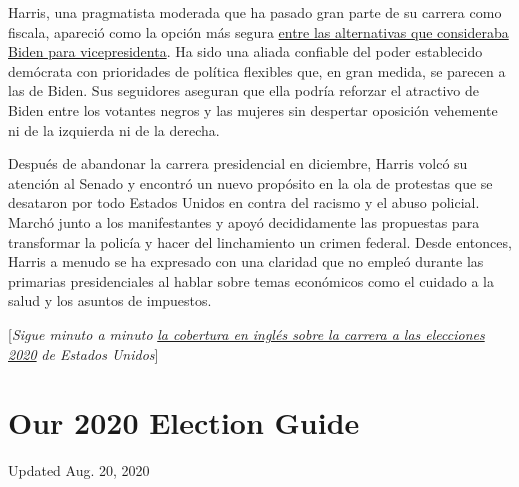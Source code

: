Harris, una pragmatista moderada que ha pasado gran parte de su carrera
como fiscala, apareció como la opción más segura
\href{https://www.nytimes3xbfgragh.onion/es/2020/07/29/espanol/estados-unidos/biden-vicepresidente.html}{entre
las alternativas que consideraba Biden para vicepresidenta}. Ha sido una
aliada confiable del poder establecido demócrata con prioridades de
política flexibles que, en gran medida, se parecen a las de Biden. Sus
seguidores aseguran que ella podría reforzar el atractivo de Biden entre
los votantes negros y las mujeres sin despertar oposición vehemente ni
de la izquierda ni de la derecha.

Después de abandonar la carrera presidencial en diciembre, Harris volcó
su atención al Senado y encontró un nuevo propósito en la ola de
protestas que se desataron por todo Estados Unidos en contra del racismo
y el abuso policial. Marchó junto a los manifestantes y apoyó
decididamente las propuestas para transformar la policía y hacer del
linchamiento un crimen federal. Desde entonces, Harris a menudo se ha
expresado con una claridad que no empleó durante las primarias
presidenciales al hablar sobre temas económicos como el cuidado a la
salud y los asuntos de impuestos.

{[}\emph{Sigue minuto a minuto}
\href{https://www.nytimes3xbfgragh.onion/news-event/2020-election}{\emph{la
cobertura en inglés sobre la carrera a las elecciones 2020}} \emph{de
Estados Unidos}{]}

\hypertarget{our-2020-election-guide}{%
\section{Our 2020 Election Guide}\label{our-2020-election-guide}}

Updated Aug. 20, 2020

